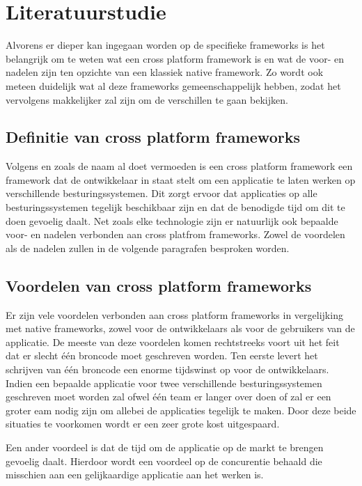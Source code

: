 \section{Literatuurstudie}
\label{sec:literatuurstudie}

Alvorens er dieper kan ingegaan worden op de specifieke frameworks is het belangrijk om te weten wat een cross platform framework is en wat de voor- en nadelen zijn ten opzichte van een klassiek native framework. Zo wordt ook meteen duidelijk wat al deze frameworks gemeenschappelijk hebben, zodat het vervolgens makkelijker zal zijn om de verschillen te gaan bekijken.

\subsection{Definitie van cross platform frameworks}

Volgens \textcite{El-Kassas2014} en zoals de naam al doet vermoeden is een cross platform framework een framework dat de ontwikkelaar in staat stelt om een applicatie te laten werken op verschillende besturingssystemen. Dit zorgt ervoor dat applicaties op alle besturingssystemen tegelijk beschikbaar zijn en dat de benodigde tijd om dit te doen gevoelig daalt. Net zoals elke technologie zijn er natuurlijk ook bepaalde voor- en nadelen verbonden aan cross platfrom frameworks. Zowel de voordelen als de nadelen zullen in de volgende paragrafen besproken worden.

\subsection{Voordelen van cross platform frameworks}

Er zijn vele voordelen verbonden aan cross platform frameworks in vergelijking met native frameworks, zowel voor de ontwikkelaars als voor de gebruikers van de applicatie. De meeste van deze voordelen komen rechtstreeks voort uit het feit dat er slecht één broncode moet geschreven worden. Ten eerste levert het schrijven van één broncode een enorme tijdswinst op voor de ontwikkelaars. Indien een bepaalde applicatie voor twee verschillende besturingssystemen geschreven moet worden zal ofwel één team er langer over doen of zal er een groter eam nodig zijn om allebei de applicaties tegelijk te maken. Door deze beide situaties te voorkomen wordt er een zeer grote kost uitgespaard. 

Een ander voordeel is dat de tijd om de applicatie op de markt te brengen gevoelig daalt. Hierdoor wordt een voordeel op de concurentie behaald die misschien aan een gelijkaardige applicatie aan het werken is. 

